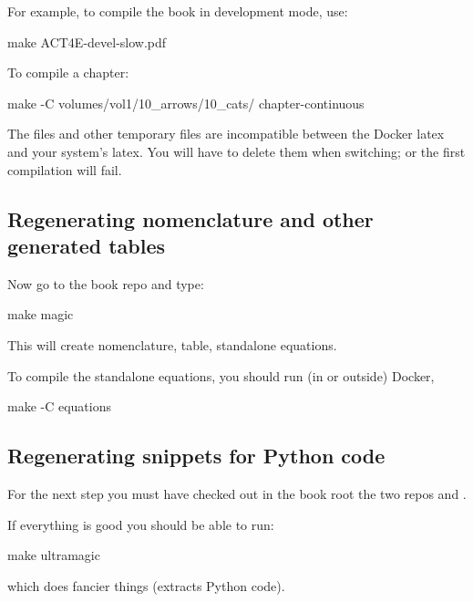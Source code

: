 For example, to compile the book in development mode, use:


\begin{console}
    make ACT4E-devel-slow.pdf
\end{console}

To compile a chapter:

\begin{console}
    make -C volumes/vol1/10_arrows/10_cats/ chapter-continuous
\end{console}

\begin{remark}
    The  files and other temporary files are incompatible between the Docker latex and your system's latex. You will have to delete them when switching; or the first compilation will fail.
\end{remark}

\subsection{Regenerating nomenclature and other generated tables}


Now go to the book repo and type:

\begin{console}
    make magic
\end{console}

This will create nomenclature, table, standalone equations.

To compile the standalone equations, you should run (in or outside) Docker,

\begin{console}
    make -C equations
\end{console}

\subsection{Regenerating snippets for Python code}


For the next step you must have checked out in the book root the two repos
 and .


If everything is good you should be able to run:
\begin{console}
    make ultramagic
\end{console}
which does fancier things (extracts Python code).


%
%
%
%
%
%

